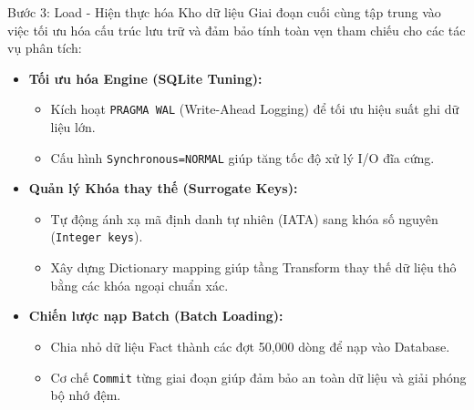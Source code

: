 \begin{frame}{Bước 3: Load - Hiện thực hóa Kho dữ liệu}
  Giai đoạn cuối cùng tập trung vào việc tối ưu hóa cấu trúc lưu trữ và đảm bảo tính toàn vẹn tham chiếu cho các tác vụ phân tích:
  
  \begin{itemize}
      \item \textbf{Tối ưu hóa Engine (SQLite Tuning):}
          \begin{itemize}
              \item Kích hoạt \texttt{PRAGMA WAL} (Write-Ahead Logging) để tối ưu hiệu suất ghi dữ liệu lớn.
              \item Cấu hình \texttt{Synchronous=NORMAL} giúp tăng tốc độ xử lý I/O đĩa cứng.
          \end{itemize}
      \item \textbf{Quản lý Khóa thay thế (Surrogate Keys):}
          \begin{itemize}
              \item Tự động ánh xạ mã định danh tự nhiên (IATA) sang khóa số nguyên (\texttt{Integer keys}).
              \item Xây dựng Dictionary mapping giúp tầng Transform thay thế dữ liệu thô bằng các khóa ngoại chuẩn xác.
          \end{itemize}
      \item \textbf{Chiến lược nạp Batch (Batch Loading):}
          \begin{itemize}
              \item Chia nhỏ dữ liệu Fact thành các đợt 50,000 dòng để nạp vào Database.
              \item Cơ chế \texttt{Commit} từng giai đoạn giúp đảm bảo an toàn dữ liệu và giải phóng bộ nhớ đệm.
          \end{itemize}
  \end{itemize}

  \end{frame}

